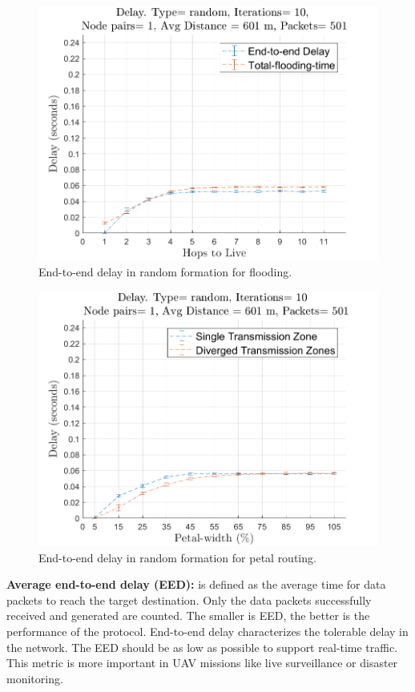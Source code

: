 \begin{figure}[hbtp]
\centering
\includegraphics[width=\simResultFigSize\textwidth]{ncsuthesis-0.6/Chapter-5/figs/fl_delay_random.png}
\caption{End-to-end delay in random formation for flooding.}
\label{fig:fl_delay_random}
\end{figure}

\begin{figure}[hbtp]
\centering
\includegraphics[width=\simResultFigSize\textwidth]{ncsuthesis-0.6/Chapter-5/figs/pe_delay_random.png}
\caption{End-to-end delay in random formation for petal routing.}
\label{fig:pe_delay_random}
\end{figure}

\textbf{Average end-to-end delay (EED):} is defined as the average time for data packets to reach the target destination. Only the data packets successfully received and generated are counted. The smaller is EED, the better is the performance of the protocol. End-to-end delay characterizes the tolerable delay in the network. The EED should be as low as possible to support real-time traffic. This metric is more important in UAV missions like live surveillance or disaster monitoring.

